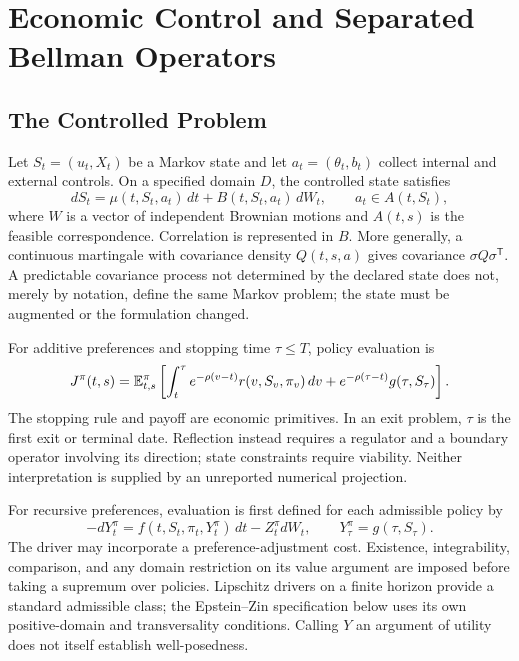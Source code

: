 \section{Economic Control and Separated Bellman Operators}
\label{sec:operators}
\subsection{The Controlled Problem}
Let $S_t=(u_t,X_t)$ be a Markov state and let $a_t=(\theta_t,b_t)$ collect internal and external controls. On a specified domain $D$, the controlled state satisfies
\begin{equation}
 dS_t=\mu(t,S_t,a_t)\,dt+B(t,S_t,a_t)\,dW_t,
 \qquad a_t\in A(t,S_t),
 \label{eq:state}
\end{equation}
where $W$ is a vector of independent Brownian motions and $A(t,s)$ is the feasible correspondence. Correlation is represented in $B$. More generally, a continuous martingale with covariance density $Q(t,s,a)$ gives covariance $\sigma Q\sigma^{\mathsf T}$. A predictable covariance process not determined by the declared state does not, merely by notation, define the same Markov problem; the state must be augmented or the formulation changed.

For additive preferences and stopping time $\tau\leq T$, policy evaluation is
\begin{equation}
 J^\pi(t,s)=\mathbb E_{t,s}^{\pi}\left[
 \int_t^\tau e^{-\rho(v-t)}r(v,S_v,\pi_v)\,dv
 +e^{-\rho(\tau-t)}g(\tau,S_\tau)\right].
 \label{eq:additive}
\end{equation}
The stopping rule and payoff are economic primitives. In an exit problem, $\tau$ is the first exit or terminal date. Reflection instead requires a regulator and a boundary operator involving its direction; state constraints require viability. Neither interpretation is supplied by an unreported numerical projection.

For recursive preferences, evaluation is first defined for each admissible policy by
\begin{equation}
 -dY_t^\pi=f(t,S_t,\pi_t,Y_t^\pi)\,dt-Z_t^\pi dW_t,
 \qquad Y_\tau^\pi=g(\tau,S_\tau).
 \label{eq:recursive}
\end{equation}
The driver may incorporate a preference-adjustment cost. Existence, integrability, comparison, and any domain restriction on its value argument are imposed before taking a supremum over policies. Lipschitz drivers on a finite horizon provide a standard admissible class; the Epstein--Zin specification below uses its own positive-domain and transversality conditions. Calling $Y$ an argument of utility does not itself establish well-posedness.

